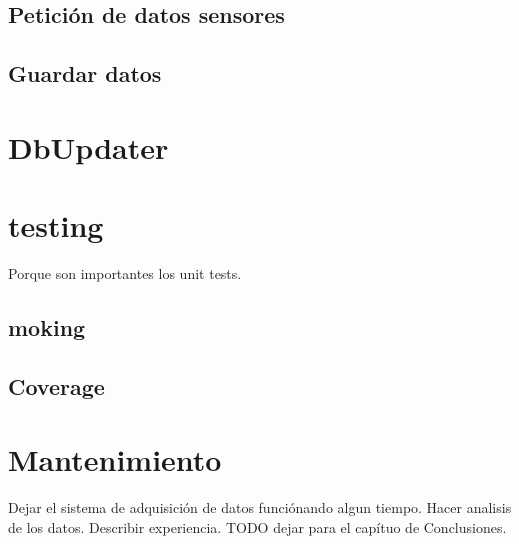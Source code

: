 	\subsection{Petición de datos sensores}
	\subsection{Guardar datos}

\section{DbUpdater}

\section{testing}
	Porque son importantes los unit tests.
	\subsection{moking}
	\subsection{Coverage}

\section{Mantenimiento}
	Dejar el sistema de adquisición de datos funciónando algun tiempo. Hacer analisis de los datos. Describir experiencia.  TODO dejar para el capítuo de Conclusiones.
